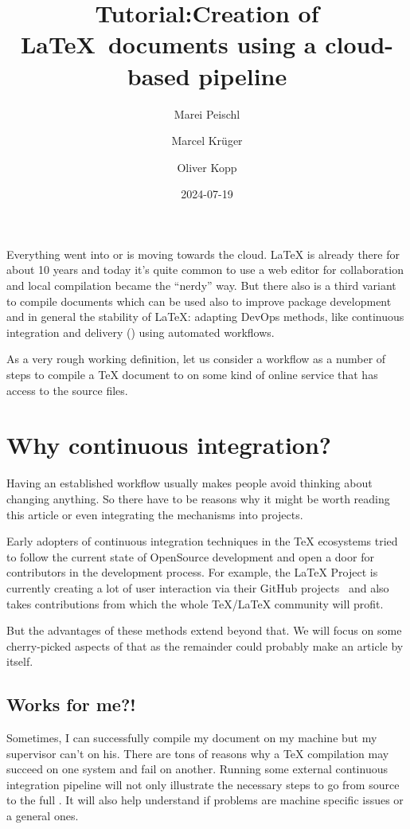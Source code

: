 \documentclass[final]{ltugboat}
\title[TUG2024: LaTeX CI/CD]{Tutorial:\newline Creation of \LaTeX\ documents using a cloud-based pipeline}
\date{2024-07-19}
\author{Marei Peischl}
\author{Marcel Krüger}
\author{Oliver Kopp}
\begin{document}
\newlength{\mintednumbersep}
%
\setlength\mintednumbersep{1em}%
\addtolength{}%

\maketitle

Everything went into or is moving towards the cloud.
\LaTeX{} is already there for about 10 years and today it's quite common to use a web editor for collaboration and local compilation became the \enquote{nerdy} way.
But there also is a third variant to compile documents which can be used also to improve package development and in general the stability of \LaTeX{}:
adapting DevOps methods, like continuous integration and delivery () using automated workflows.

As a very rough working definition, let us consider a  workflow as a number of steps to compile a TeX document to  on some kind of online service that has access to the source files.

\section{Why continuous integration?}
Having an established workflow usually makes people avoid thinking about changing anything.
So there have to be reasons why it might be worth reading this article or even integrating the mechanisms into projects.

Early adopters of continuous integration techniques in the TeX ecosystems tried to follow the current state of OpenSource development and open a door for contributors in the development process.
For example, the \LaTeX{} Project is currently creating a lot of user interaction via their GitHub projects~\cite{latex3-github} and also takes contributions from which the whole \TeX/\LaTeX{} community will profit.

But the advantages of these methods extend beyond that. We will focus on some cherry-picked aspects of that as the remainder could probably make an article by itself.

\subsection{Works for me?!}
Sometimes, I can successfully compile my document on my machine but my supervisor can't on his.
There are tons of reasons why a TeX compilation may succeed on one system and fail on another.
Running some external continuous integration pipeline will not only illustrate the necessary steps to go from source to the full .
It will also help understand if problems are machine specific issues or a general ones.
\end{document}
